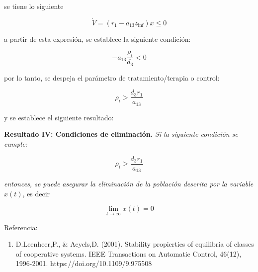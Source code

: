 \documentclass[letterpaper,11pt]{article}
\begin{document}
se tiene lo siguiente

\begin{equation*}
\dot{V}=\left( r_{1}-a_{13}z_{\inf }\right) x\leq 0
\end{equation*}

a partir de esta expresi\'{o}n, se establece la siguiente condici\'{o}n:

\begin{equation*}
-a_{13}\frac{\rho _{i}}{d_{3}}<0
\end{equation*}

por lo tanto, se despeja el par\'{a}metro de tratamiento/terapia o control:

\begin{equation*}
\rho _{i}>\frac{d_{3}r_{1}}{a_{13}}
\end{equation*}

y se establece el siguiente resultado:

\bigskip

\textbf{Resultado IV: Condiciones de eliminaci\'{o}n. }\textit{Si la
siguiente condici\'{o}n se cumple:}

\begin{equation*}
\rho _{i}>\frac{d_{3}r_{1}}{a_{13}}
\end{equation*}

\textit{entonces, se puede asegurar la eliminaci\'{o}n de la poblaci\'{o}n
descrita por la variable }$x\left( t\right) $, es decir

\begin{equation*}
\lim_{t\rightarrow \infty }x\left( t\right) =0
\end{equation*}

\bigskip

\bigskip

Referencia:

\begin{enumerate}
\item D.Leenheer,P., \& Aeyels,D. (2001). Stability propierties of
equilibria of classes of cooperative systems. IEEE Transactions on Automatic
Control, 46(12), 1996-2001. https://doi.org/10.1109/9.975508
\end{enumerate}
\end{document}
